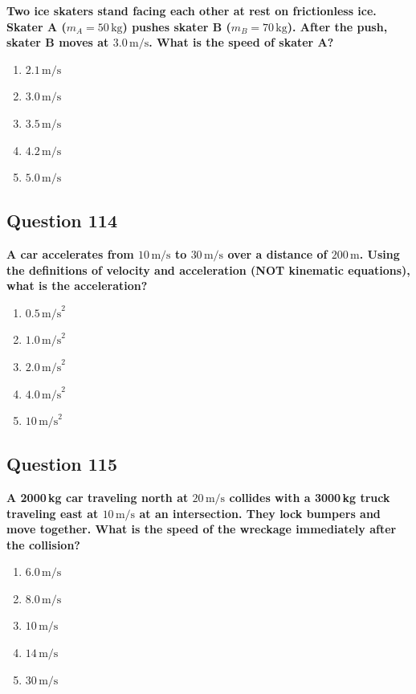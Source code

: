 \documentclass[12pt,letterpaper]{article}
\begin{document}
\begin{questionbox}
\textbf{Two ice skaters stand facing each other at rest on frictionless ice. Skater A ($m_A = 50\,\text{kg}$) pushes skater B ($m_B = 70\,\text{kg}$). After the push, skater B moves at $3.0\,\text{m/s}$. What is the speed of skater A?}

\begin{enumerate}[label=\alph*)]
    \item $2.1\,\text{m/s}$
    \item $3.0\,\text{m/s}$
    \item $3.5\,\text{m/s}$
    \item $4.2\,\text{m/s}$
    \item $5.0\,\text{m/s}$
\end{enumerate}
\end{questionbox}

\subsection{Question 114}

\begin{questionbox}
\textbf{A car accelerates from $10\,\text{m/s}$ to $30\,\text{m/s}$ over a distance of $200\,\text{m}$. Using the definitions of velocity and acceleration (NOT kinematic equations), what is the acceleration?}

\begin{enumerate}[label=\alph*)]
    \item $0.5\,\text{m/s}^2$
    \item $1.0\,\text{m/s}^2$
    \item $2.0\,\text{m/s}^2$
    \item $4.0\,\text{m/s}^2$
    \item $10\,\text{m/s}^2$
\end{enumerate}
\end{questionbox}

\subsection{Question 115}

\begin{questionbox}
\textbf{A 2000\,kg car traveling north at $20\,\text{m/s}$ collides with a 3000\,kg truck traveling east at $10\,\text{m/s}$ at an intersection. They lock bumpers and move together. What is the speed of the wreckage immediately after the collision?}

\begin{enumerate}[label=\alph*)]
    \item $6.0\,\text{m/s}$
    \item $8.0\,\text{m/s}$
    \item $10\,\text{m/s}$
    \item $14\,\text{m/s}$
    \item $30\,\text{m/s}$
\end{enumerate}
\end{questionbox}
\end{document}
